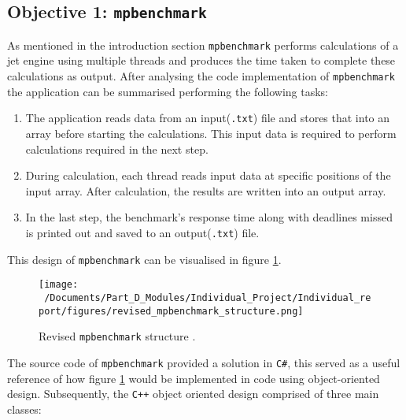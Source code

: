 \subsection{Objective 1: \texttt{mpbenchmark}}
As mentioned in the introduction section \texttt{mpbenchmark} performs calculations of a jet engine using multiple threads and produces the time taken to complete these calculations as output. After analysing the code implementation of \texttt{mpbenchmark} the application can be summarised performing the following tasks:

\begin{enumerate}
	\item The application reads data from an input(\texttt{.txt}) file and stores that into an array before starting the calculations. This input data is required to perform calculations required in the next step. 
	\item During calculation, each thread reads input data at specific positions of the input array. After calculation, the results are written into an output array.
	\item In the last step, the benchmark’s response time along with deadlines missed is printed out and saved to an output(\texttt{.txt}) file. 
\end{enumerate}

This design of \texttt{mpbenchmark} can be visualised in figure \ref*{fig:revised_mpbenchmark_structure}.

\begin{figure}[h] %
	\centering
	\texttt{[image: ~/Documents/Part\_D\_Modules/Individual\_Project/Individual\_report/figures/revised\_mpbenchmark\_structure.png]} %
	\caption{Revised \texttt{mpbenchmark} structure \cite{mpbenchmark_paper}.}
	\label{fig:revised_mpbenchmark_structure} %
\end{figure}

The source code of \texttt{mpbenchmark} provided a solution in \texttt{C\#}, this served as a useful reference of how figure \ref*{fig:revised_mpbenchmark_structure} would be implemented in code using object-oriented design. Subsequently, the \texttt{C++} object oriented design comprised of three main classes:

